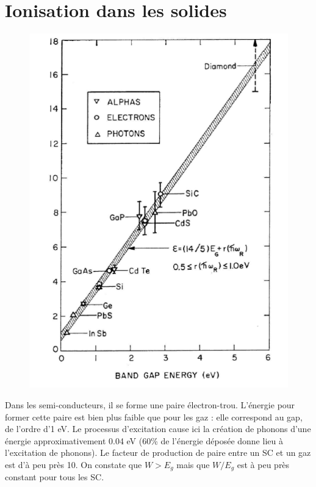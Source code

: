 \section{Ionisation dans les solides}%
	\begin{figure}
	\vspace{-15mm}
	\includegraphics[scale=0.25]{ch6/image1}
	\end{figure}
Dans les semi-conducteurs, il se forme une paire électron-trou. L'énergie pour former cette paire
est bien plus faible que pour les gaz : elle correspond au gap, de l'ordre d'1 eV. Le processus
d'excitation cause ici la création de phonons d'une énergie approximativement 0.04 eV (60\% de
l'énergie déposée donne lieu à l'excitation de phonons). Le facteur de production de paire entre
un SC et un gaz est d'à peu près 10. On constate que $W>E_g$ mais que $W/E_g$ est à peu près 
constant pour tous les SC.

